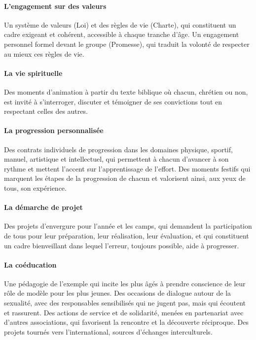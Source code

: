 \documentclass[titlepage,11pt,a4paper]{article}
\begin{document}
\paragraph*{L'engagement sur des valeurs}

Un système de valeurs (Loi) et des règles de vie (Charte), qui constituent un cadre exigeant et cohérent, accessible à chaque tranche d'âge.
Un engagement personnel formel devant le groupe (Promesse), qui traduit la volonté de respecter au mieux ces règles de vie.

\paragraph*{La vie spirituelle}

Des moments d'animation à partir du texte biblique où chacun, chrétien ou non, est invité à s'interroger, discuter et témoigner de ses convictions tout en respectant celles des autres.

\paragraph*{La progression personnalisée}

Des contrats individuels de progression dans les domaines physique, sportif, manuel, artistique et intellectuel, qui permettent à chacun d'avancer à son rythme et mettent l'accent sur l'apprentissage de l'effort.
Des moments festifs qui marquent les étapes de la progression de chacun et valorisent ainsi, aux yeux de tous, son expérience.

\paragraph*{La démarche de projet}

Des projets d'envergure pour l'année et les camps, qui demandent la participation de tous pour leur préparation, leur réalisation, leur évaluation, et qui constituent un cadre bienveillant dans lequel l'erreur, toujours possible, aide à progresser.

\paragraph*{La coéducation}

Une pédagogie de l'exemple qui incite les plus âgés à prendre conscience de leur rôle de modèle pour les plus jeunes.
Des occasions de dialogue autour de la sexualité, avec des responsables sensibilisés qui ne jugent pas, mais qui écoutent et rassurent.
Des actions de service et de solidarité, menées en partenariat avec d'autres associations, qui favorisent la rencontre et la découverte réciproque.
Des projets tournés vers l'international, sources d'échanges interculturels.
\end{document}
